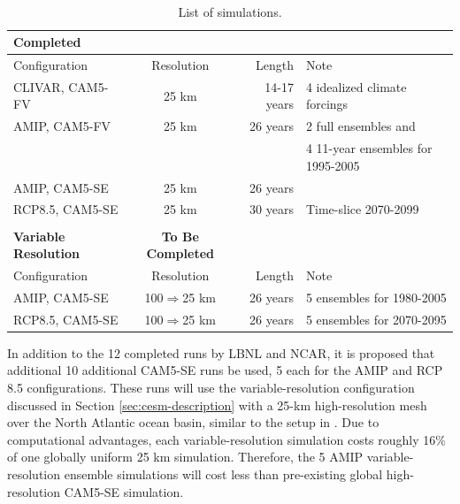 \documentclass[11pt]{article}
\begin{document}
\begin{table} 
\begin{center}
\caption{List of simulations.\label{t:runs} }
\ \\
\begin{tabular}{l c r l}
\textbf{Completed} \\
\hline
Configuration & Resolution & Length & Note \\ 
\hline
CLIVAR, CAM5-FV & 25 km & 14-17 years & 4 idealized climate forcings  \\
AMIP, CAM5-FV & 25 km & 26 years    & 2 full ensembles and  \\
& & & 4 11-year ensembles for 1995-2005 \\
AMIP, CAM5-SE & 25 km & 26 years    & \\
RCP8.5, CAM5-SE & 25 km & 30 years    & Time-slice 2070-2099 \\
\hline
\\
\textbf{Variable Resolution} & \textbf{To Be Completed} & & \\
\hline
Configuration & Resolution & Length & Note \\ 
\hline
AMIP, CAM5-SE & 100$\Rightarrow$25 km & 26 years    & 5 ensembles for 1980-2005 \\
RCP8.5, CAM5-SE & 100$\Rightarrow$25 km & 26 years    & 5 ensembles for 2070-2095 \\
\hline
\end{tabular}
\end{center}
\end{table}

In addition to the 12 completed runs by LBNL and NCAR, it is proposed that additional 10 additional CAM5-SE runs be used, 5 each for the AMIP and RCP 8.5 configurations.  These runs will use the variable-resolution configuration discussed in Section \ref{sec:cesm-description} with a 25-km high-resolution mesh over the North Atlantic ocean basin, similar to the setup in \citet{Zarzycki2014multidecadal}. Due to computational advantages, each variable-resolution simulation costs roughly 16\% of one globally uniform 25 km simulation.  Therefore, the 5 AMIP variable-resolution ensemble simulations will cost less than pre-existing global high-resolution CAM5-SE simulation. 
\end{document}
